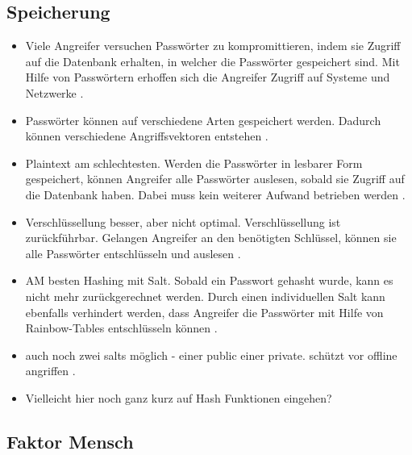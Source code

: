\subsection{Speicherung}

\begin{itemize}
    \item Viele Angreifer versuchen Passwörter zu kompromittieren, indem sie Zugriff auf die Datenbank erhalten, in welcher die Passwörter gespeichert sind. Mit Hilfe von Passwörtern erhoffen sich die Angreifer Zugriff auf Systeme und Netzwerke \cite{boonkrong2012security}.
    \item Passwörter können auf verschiedene Arten gespeichert werden. Dadurch können verschiedene Angriffsvektoren entstehen \cite{chanda2016password}.
    \item Plaintext am schlechtesten. Werden die Passwörter in lesbarer Form gespeichert, können Angreifer alle Passwörter auslesen, sobald sie Zugriff auf die Datenbank haben. Dabei muss kein weiterer Aufwand betrieben werden \cite{chanda2016password}.
    \item Verschlüssellung besser, aber nicht optimal. Verschlüssellung ist zurückführbar. Gelangen Angreifer an den benötigten Schlüssel, können sie alle Passwörter entschlüsseln und auslesen \cite{chanda2016password}.
    \item AM besten Hashing mit Salt. Sobald ein Passwort gehasht wurde, kann es nicht mehr zurückgerechnet werden. Durch einen individuellen Salt kann ebenfalls verhindert werden, dass Angreifer die Passwörter mit Hilfe von Rainbow-Tables entschlüsseln können \cite{chanda2016password}.
    \item auch noch zwei salts möglich - einer public einer private. schützt vor offline angriffen \cite{chanda2016password}.
    \item Vielleicht hier noch ganz kurz auf Hash Funktionen eingehen?
\end{itemize}

\subsection{Faktor Mensch}

